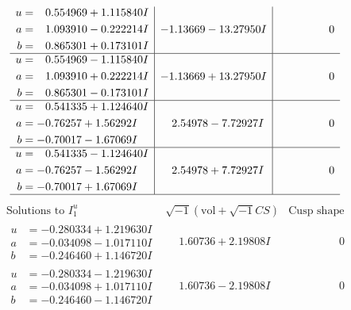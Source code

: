 \documentclass[1p]{elsarticle_modified}
\theoremstyle{definition}
\newcommand{\I}{\sqrt{-1}}
\begin{document}
$$\begin{array}{c|c|c}
\begin{aligned}
u &= \phantom{-}0.554969 + 1.115840 I \\
a &= \phantom{-}1.093910 - 0.222214 I \\
b &= \phantom{-}0.865301 + 0.173101 I\end{aligned}
 & -1.13669 - 13.27950 I & \phantom{-0.000000 } 0 \\ \hline\begin{aligned}
u &= \phantom{-}0.554969 - 1.115840 I \\
a &= \phantom{-}1.093910 + 0.222214 I \\
b &= \phantom{-}0.865301 - 0.173101 I\end{aligned}
 & -1.13669 + 13.27950 I & \phantom{-0.000000 } 0 \\ \hline\begin{aligned}
u &= \phantom{-}0.541335 + 1.124640 I \\
a &= -0.76257 + 1.56292 I \\
b &= -0.70017 - 1.67069 I\end{aligned}
 & \phantom{-}2.54978 - 7.72927 I & \phantom{-0.000000 } 0 \\ \hline\begin{aligned}
u &= \phantom{-}0.541335 - 1.124640 I \\
a &= -0.76257 - 1.56292 I \\
b &= -0.70017 + 1.67069 I\end{aligned}
 & \phantom{-}2.54978 + 7.72927 I & \phantom{-0.000000 } 0\\
 \hline 
 \end{array}$$\newpage$$\begin{array}{c|c|c}  
\text{Solutions to }I^u_{1}& \I (\text{vol} + \sqrt{-1}CS) & \text{Cusp shape}\\
 \hline 
\begin{aligned}
u &= -0.280334 + 1.219630 I \\
a &= -0.034098 - 1.017110 I \\
b &= -0.246460 + 1.146720 I\end{aligned}
 & \phantom{-}1.60736 + 2.19808 I & \phantom{-0.000000 } 0 \\ \hline\begin{aligned}
u &= -0.280334 - 1.219630 I \\
a &= -0.034098 + 1.017110 I \\
b &= -0.246460 - 1.146720 I\end{aligned}
 & \phantom{-}1.60736 - 2.19808 I & \phantom{-0.000000 } 0 \\ \hline\begin{aligned}

\end{aligned}
\end{array}$$
\end{document}
